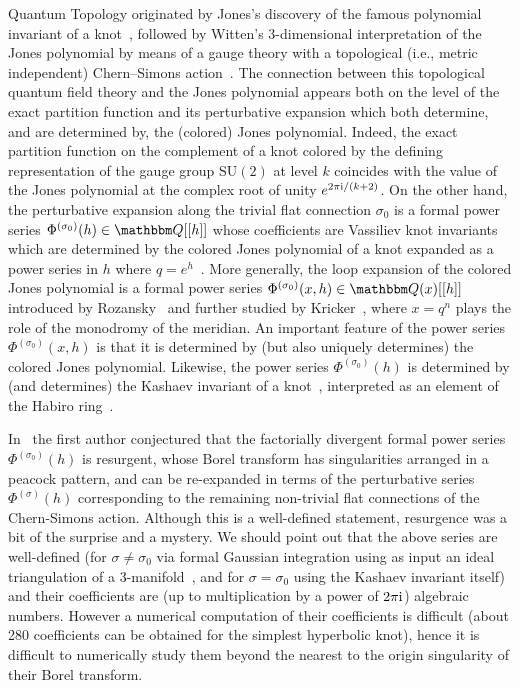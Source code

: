 \documentclass[12pt,reqno]{amsart}
\theoremstyle{definition}
\def\BQ{\mathbbm Q}
\def\s{\sigma}
\def\ri{\mathrm{i}}
\def\ri{{\rm i}}
\def\SU{\mathrm{SU}}
\begin{document}
Quantum Topology originated by Jones's discovery of the famous
polynomial invariant of a knot~\cite{Jones}, followed by Witten's
3-dimensional interpretation of the Jones polynomial by means of a
gauge theory with a topological (i.e., metric independent)
Chern--Simons action~\cite{witten-jones}.  The connection between this
topological quantum field theory and the Jones polynomial appears both
on the level of the exact partition function and its perturbative
expansion which both determine, and are determined by, the (colored)
Jones polynomial. Indeed, the exact partition function on the
complement of a knot colored by the defining representation of the
gauge group $\SU(2)$ at level $k$ coincides with the value of the
Jones polynomial at the complex root of unity $e^{2\pi\ri/(k+2)}$. On
the other hand, the perturbative expansion along the trivial flat
connection $\s_0$ is a formal power series
$\Phi^{(\s_0)}(h) \in \BQ[[h]]$ whose coefficients are Vassiliev knot
invariants which are determined by the colored Jones polynomial of a
knot expanded as a power series in $h$ where
$q=e^h$~\cite{Bar-Natan}. More generally, the loop expansion of the
colored Jones polynomial is a formal power series
$\Phi^{(\s_0)}(x,h) \in \BQ(x)[[h]]$ introduced by
Rozansky~\cite{Rozansky:bureau} and further studied by
Kricker~\cite{Kricker, GK:noncommutative}, where $x=q^n$ plays the role of the
monodromy of the meridian. An important feature of the power series
$\Phi^{(\s_0)}(x,h)$ is that it is determined by (but also uniquely
determines) the colored Jones polynomial.  Likewise, the power series
$\Phi^{(\s_0)}(h)$ is determined by (and determines) the Kashaev
invariant of a knot~\cite{K95}, interpreted as an element of the
Habiro ring~\cite{Habiro:WRT}.

In~\cite{Ga:resurgence} the first author conjectured that the factorially divergent
formal power series $\Phi^{(\s_0)}(h)$ is resurgent, whose Borel transform has
singularities arranged in a peacock pattern, and can be re-expanded
in terms of the perturbative series $\Phi^{(\s)}(h)$ corresponding
to the remaining non-trivial flat connections of the Chern-Simons action. Although this
is a well-defined statement, resurgence was a bit of the surprise and a mystery.
We should point out that the above series are well-defined (for $\s\neq \s_0$ via
formal Gaussian integration using as input an ideal triangulation of a
3-manifold~\cite{DG}, and for $\s=\s_0$ using the Kashaev invariant itself) and their
coefficients are (up to multiplication by a power of $2\pi\ri$) algebraic numbers.
However a numerical computation of their coefficients is difficult (about 280
coefficients can be obtained for the simplest hyperbolic knot), hence it is difficult
to numerically study them beyond the nearest to the origin singularity of their Borel
transform.
\end{document}
